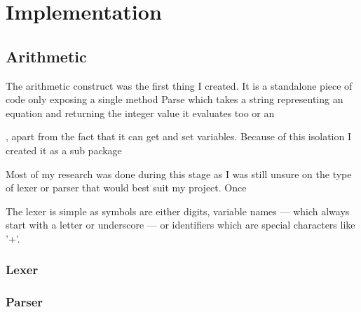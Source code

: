 \chapter{Implementation}




\section{Arithmetic}
The arithmetic construct was the first thing I created.
It is a standalone piece of code only exposing a single method Parse which takes a string representing an equation and returning the integer value it evaluates too or an 

, apart from the fact that it can get and set variables.
Because of this isolation I created it as a sub package 


Most of my research was done during this stage as I was still unsure on the type of lexer or parser that would best suit my project.
Once 

The lexer is simple as symbols are either digits, variable names --- which always start with a letter or underscore --- or identifiers which are special characters like '+'.




\subsection{Lexer}


\subsection{Parser}

